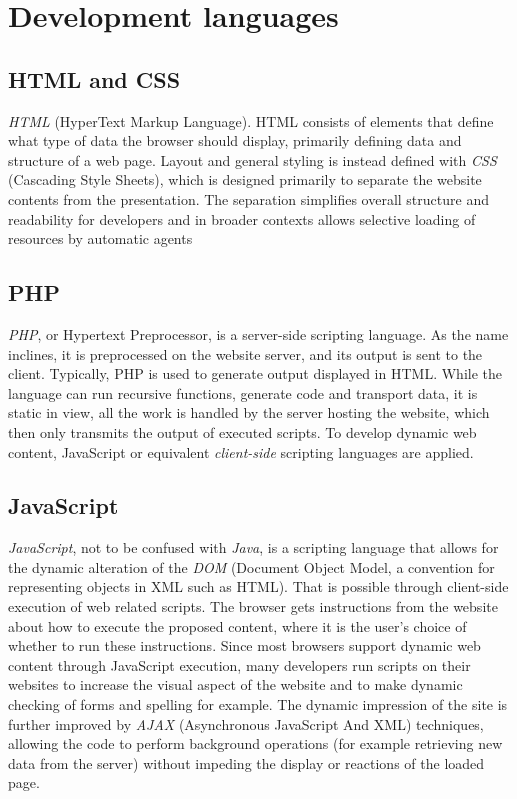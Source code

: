 \section{Development languages}

\subsection*{HTML and CSS}
\label{program_tools_html_css}
\emph{HTML} (HyperText Markup Language). HTML consists of elements that define what type of data the browser should display, primarily defining data and structure of a web page. Layout and general styling is instead defined with \emph{CSS} (Cascading Style Sheets), which is designed primarily to separate the website contents from the presentation.
The separation simplifies overall structure and readability for developers and in broader contexts allows selective loading of resources by automatic agents\cite{html}\cite{css}

\subsection*{PHP}
\emph{PHP}, or Hypertext Preprocessor, is a server-side scripting language. As the name inclines, it is preprocessed on the website server, and its output is sent to the client. Typically, PHP is used to generate output displayed in HTML. While the language can run recursive functions, generate code and transport data, it is static in view, all the work is handled by the server hosting the website, which then only transmits the output of executed scripts. To develop dynamic web content, JavaScript or equivalent \emph{client-side} scripting languages are applied.\cite{php}

\subsection*{JavaScript}
\emph{JavaScript}, not to be confused with \emph{Java}, is a scripting language that allows for the dynamic alteration of the \emph{DOM} (Document Object Model, a convention for representing objects in XML such as HTML). That is possible through client-side execution of web related scripts. The browser gets instructions from the website about how to execute the proposed content, where it is the user's choice of whether to run these instructions.
Since most browsers support dynamic web content through JavaScript execution, many developers run scripts on their websites to increase the visual aspect of the website and to make dynamic checking of forms and spelling for example.\cite{javascript} The dynamic impression of the site is further improved by \emph{AJAX} (Asynchronous JavaScript And XML) techniques, allowing the code to perform background operations (for example retrieving new data from the server) without impeding the display or reactions of the loaded page.
